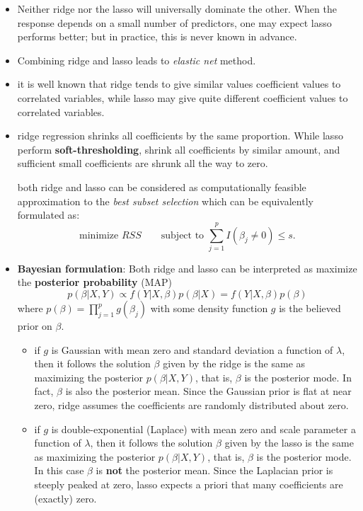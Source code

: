 \documentclass[
  letterpaper,
  DIV=11,
  numbers=noendperiod]{scrreprt}
\providecommand{\tightlist}{%
  \setlength{\itemsep}{0pt}\setlength{\parskip}{0pt}}\usepackage{longtable,booktabs,array}
\begin{document}
\begin{itemize}
\item
  Neither ridge nor the lasso will universally dominate the other. When
  the response depends on a small number of predictors, one may expect
  lasso performs better; but in practice, this is never known in
  advance.
\item
  Combining ridge and lasso leads to \emph{elastic net} method.
\item
  it is well known that ridge tends to give similar values coefficient
  values to correlated variables, while lasso may give quite different
  coefficient values to correlated variables.
\item
  ridge regression shrinks all coefficients by the same proportion.
  While lasso perform \textbf{soft-thresholding}, shrink all
  coefficients by similar amount, and sufficient small coefficients are
  shrunk all the way to zero.

  both ridge and lasso can be considered as computationally feasible
  approximation to the \emph{best subset selection} which can be
  equivalently formulated as: \[
  \text{minimize } RSS \qquad \text{subject to } \sum_{j=1}^p I(\beta_j\ne 0) \le s.
  \]
\item
  \textbf{Bayesian formulation}: Both ridge and lasso can be interpreted
  as maximize the \textbf{posterior probability} (MAP) \[
  p(\beta|X,Y)\propto f(Y|X,\beta) p(\beta|X)=f(Y|X,\beta)p(\beta)
  \] where \(p(\beta)= \prod_{j=1}^p g(\beta_j)\) with some density
  function \(g\) is the believed prior on \(\beta\).

  \begin{itemize}
  \tightlist
  \item
    if \(g\) is Gaussian with mean zero and standard deviation a
    function of \(\lambda\), then it follows the solution \(\beta\)
    given by the ridge is the same as maximizing the posterior
    \(p(\beta|X,Y)\), that is, \(\beta\) is the posterior mode. In fact,
    \(\beta\) is also the posterior mean. Since the Gaussian prior is
    flat at near zero, ridge assumes the coefficients are randomly
    distributed about zero.
  \item
    if \(g\) is double-exponential (Laplace) with mean zero and scale
    parameter a function of \(\lambda\), then it follows the solution
    \(\beta\) given by the lasso is the same as maximizing the posterior
    \(p(\beta|X,Y)\), that is, \(\beta\) is the posterior mode. In this
    case \(\beta\) is \textbf{not} the posterior mean. Since the
    Laplacian prior is steeply peaked at zero, lasso expects a priori
    that many coefficients are (exactly) zero.
  \end{itemize}
\end{itemize}
\end{document}
